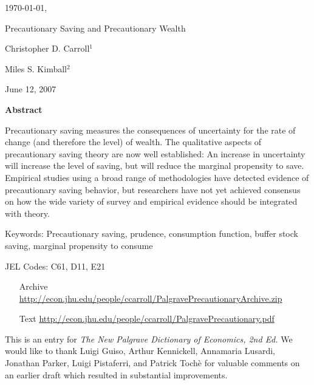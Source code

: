 \documentclass[12pt,letterpaper]{econtex}
\begin{document}
\begin{titlepage}

\enlargethispage{3000pt}

\hfill{\tiny \today, \jobname}



\vspace{0.2in}

\centerline{\LARGE Precautionary Saving and Precautionary Wealth}

\vspace{.2in}

\normalsize

\centerline{\Large Christopher D. Carroll$^1$}
\medskip\medskip
\centerline{\Large Miles S. Kimball$^2$}
\medskip
\medskip


\centerline{June 12, 2007}

\vspace{.2in}

\centerline{\bf Abstract}
\normalsize

Precautionary saving measures the consequences of uncertainty for the
rate of change (and therefore the level) of wealth.  The qualitative
aspects of precautionary saving theory are now well established: An
increase in uncertainty will increase the level of saving, but will
reduce the marginal propensity to save.  Empirical studies using a
broad range of methodologies have detected evidence of precautionary
saving behavior, but researchers have not yet achieved consensus on
how the wide variety of survey and empirical evidence should be
integrated with theory.

\vspace{0.2in}

\noindent Keywords: Precautionary saving, prudence, consumption function, buffer stock saving, 
marginal propensity to consume
\medskip\medskip

\noindent JEL Codes: C61, D11, E21

\medskip

\begin{small}
\begin{itemize}
\item[Archive]  \url{http://econ.jhu.edu/people/ccarroll/PalgravePrecautionaryArchive.zip}
\item[Text]     \url{http://econ.jhu.edu/people/ccarroll/PalgravePrecautionary.pdf}
\end{itemize}


\noindent This is an entry for {\it The New Palgrave Dictionary of Economics, 2nd Ed.}  We would like to thank Luigi Guiso, Arthur Kennickell, Annamaria Lusardi, Jonathan Parker, Luigi Pistaferri,
and Patrick Toch\`e for valuable comments on an earlier draft which resulted in substantial improvements.



\end{small}
\end{titlepage}
\end{document}
